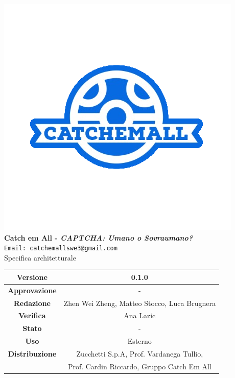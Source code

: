 \begin{titlepage}
\begin{center}
	\includegraphics[scale = 1.5]{img/logo.png}\\
	\bigskip
	\large \textbf{Catch em All - \textit{CAPTCHA: Umano o Sovraumano?}}\\
	\texttt{Email: catchemallswe3@gmail.com}\\
	\vfill
	{\fontsize{1.5cm}{0}\selectfont Specifica architetturale}\\
	\vfill
	\setlength\extrarowheight{5pt}
	\begin{tabularx}{\textwidth}{| c | c |}
		\hline
		\textbf{Versione} & 0.1.0\\
		\hline
		\textbf{Approvazione} & -\\
		\hline
		\textbf{Redazione} & Zhen Wei Zheng, Matteo Stocco, Luca Brugnera\\
		\hline
		\textbf{Verifica} & Ana Lazic\\
		\hline
		\textbf{Stato} & -\\
		\hline
		\textbf{Uso} & Esterno\\
		\hline
		\textbf{Distribuzione} & Zucchetti S.p.A, Prof. Vardanega Tullio,\\
		& Prof. Cardin Riccardo, Gruppo Catch Em All\\
		\hline
	\end{tabularx}
\end{center}
\end{titlepage}
